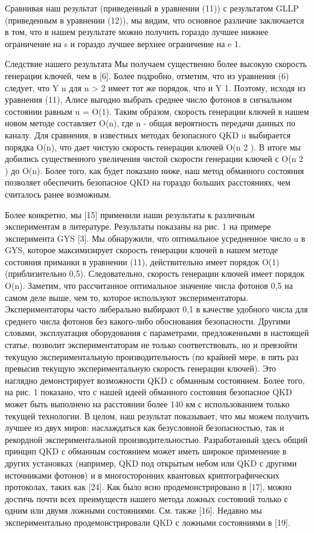 Сравнивая наш результат (приведенный в уравнении (11)) с результатом GLLP (приведенным в уравнении (12)), мы видим, что основное различие заключается в том, что в нашем результате можно получить гораздо лучшее нижнее ограничение на s и гораздо лучшее верхнее ограничение на e 1.

Следствие нашего результата Мы получаем существенно более высокую скорость генерации ключей, чем в [6]. Более подробно, отметим, что из уравнения (6) следует, что Y n для n > 2 имеет тот же порядок, что и Y 1. Поэтому, исходя из уравнения (11), Алисе выгодно выбрать среднее число фотонов в сигнальном состоянии равным u = O(1). Таким образом, скорость генерации ключей в нашем новом методе составляет O(n), где n - общая вероятность передачи данных по каналу. Для сравнения, в известных методах безопасного QKD u выбирается порядка O(n), что дает чистую скорость генерации ключей O(n 2 ).
В итоге мы добились существенного увеличения чистой скорости генерации ключей с O(n 2 ) до O(n). Более того, как будет показано ниже, наш метод обманного состояния позволяет обеспечить безопасное QKD на гораздо больших расстояниях, чем считалось ранее возможным.

Более конкретно, мы [15] применили наши результаты к различным экспериментам в литературе. Результаты показаны на рис. 1 на примере эксперимента GYS [3]. Мы обнаружили, что оптимальное усредненное число u в GYS, которое максимизирует скорость генерации ключей в нашем методе состояния приманки в уравнении (11), действительно имеет порядок O(1) (приблизительно 0,5). Следовательно, скорость генерации ключей имеет порядок O(n). Заметим, что рассчитанное оптимальное значение числа фотонов 0,5 на самом деле выше, чем то, которое используют экспериментаторы. Экспериментаторы часто либерально выбирают 0,1 в качестве удобного числа для среднего числа фотонов без какого-либо обоснования безопасности. Другими словами, эксплуатация оборудования с параметрами, предложенными в настоящей статье, позволит экспериментаторам не только соответствовать, но и превзойти текущую экспериментальную производительность (по крайней мере, в пять раз превысив текущую экспериментальную скорость генерации ключей). Это наглядно демонстрирует возможности QKD с обманным состоянием. Более того, на рис. 1 показано, что с нашей идеей обманного состояния безопасное QKD может быть выполнено на расстоянии более 140 км с использованием только текущей технологии. В целом, наш результат показывает, что мы можем получить лучшее из двух миров: наслаждаться как безусловной безопасностью, так и рекордной экспериментальной производительностью. Разработанный здесь общий принцип QKD с обманным состоянием может иметь широкое применение в других установках (например, QKD под открытым небом или QKD с другими источниками фотонов) и в многосторонних квантовых криптографических протоколах, таких как [24]. Как было ясно продемонстрировано в [17], можно достичь почти всех преимуществ нашего метода ложных состояний только с одним или двумя ложными состояниями. См. также [16]. Недавно мы экспериментально продемонстрировали QKD с ложными состояниями в [19].

